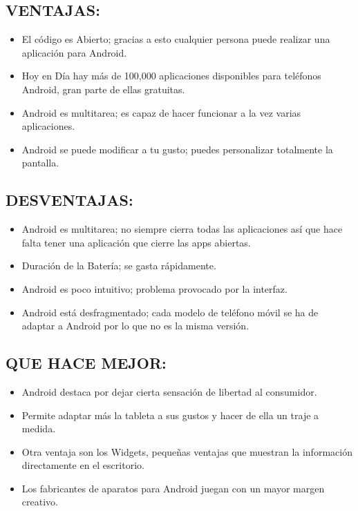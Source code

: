 \subsection*{VENTAJAS:}
\begin{itemize}
	\item El código es Abierto; gracias a esto cualquier persona puede realizar una aplicación para Android.
	\item Hoy en Día hay más de 100,000 aplicaciones disponibles para teléfonos Android, gran parte de ellas gratuitas.
	\item Android es multitarea; es capaz de hacer funcionar a la vez varias aplicaciones.
	\item Android se puede modificar a tu gusto; puedes personalizar totalmente la pantalla.
\end{itemize} 

\subsection*{DESVENTAJAS:}
\begin{itemize}
	\item Android es multitarea; no siempre cierra todas las aplicaciones así que hace falta tener una aplicación que cierre las apps abiertas.
	\item Duración de la Batería; se gasta rápidamente.
	\item Android es poco intuitivo; problema provocado por la interfaz.
	\item Android está desfragmentado; cada modelo de teléfono móvil se ha de adaptar a Android por lo que no es la misma versión.
\end{itemize}

\subsection*{QUE HACE MEJOR:}
\begin{itemize}
	\item Android destaca por dejar cierta sensación de libertad al consumidor.
	\item Permite adaptar más la tableta a sus gustos y hacer de ella un traje a medida.
	\item Otra ventaja son los Widgets, pequeñas ventajas que muestran la información directamente en el escritorio.
	\item Los fabricantes de aparatos para Android juegan con un mayor margen creativo.
\end{itemize}


